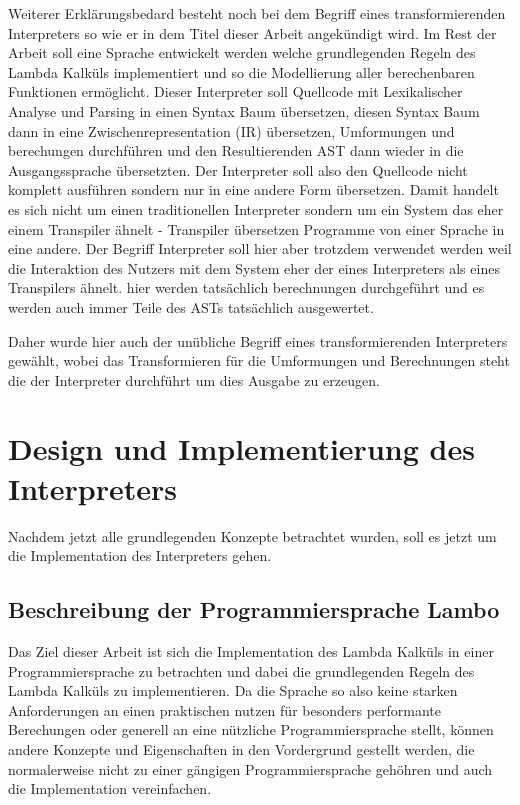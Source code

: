 \documentclass[ngerman]{article}
\begin{document}
Weiterer Erklärungsbedard besteht noch bei dem Begriff eines transformierenden Interpreters so wie er in dem Titel dieser Arbeit angekündigt wird. Im Rest der Arbeit soll eine Sprache entwickelt werden welche grundlegenden Regeln des Lambda Kalküls implementiert und so die Modellierung aller berechenbaren Funktionen ermöglicht. Dieser Interpreter soll Quellcode mit Lexikalischer Analyse und Parsing in einen Syntax Baum übersetzen, diesen Syntax Baum dann in eine Zwischenrepresentation (IR) übersetzen, Umformungen und berechungen durchführen und den Resultierenden AST dann wieder in die Ausgangssprache übersetzten. Der Interpreter soll also den Quellcode nicht komplett ausführen sondern nur in eine andere Form übersetzen. Damit handelt es sich nicht um einen traditionellen Interpreter sondern um ein System das eher einem Transpiler ähnelt - Transpiler übersetzen Programme von einer Sprache in eine andere. Der Begriff Interpreter soll hier aber trotzdem verwendet werden weil die Interaktion des Nutzers mit dem System eher der eines Interpreters als eines Transpilers ähnelt. hier werden tatsächlich berechnungen durchgeführt und es werden auch immer Teile des ASTs tatsächlich ausgewertet.

Daher wurde hier auch der unübliche Begriff eines transformierenden Interpreters gewählt, wobei das Transformieren für die Umformungen und Berechnungen steht die der Interpreter durchführt um dies Ausgabe zu erzeugen.

\section{Design und Implementierung des Interpreters}

Nachdem jetzt alle grundlegenden Konzepte betrachtet wurden, soll es jetzt um die Implementation des Interpreters gehen. 

\subsection{Beschreibung der Programmiersprache Lambo}

Das Ziel dieser Arbeit ist sich die Implementation des Lambda Kalküls in einer Programmiersprache zu betrachten und dabei die grundlegenden Regeln des Lambda Kalküls zu implementieren. Da die Sprache so also keine starken Anforderungen an einen praktischen nutzen für besonders performante Berechungen oder generell an eine nützliche Programmiersprache stellt, können andere Konzepte und Eigenschaften in den Vordergrund gestellt werden, die normalerweise nicht zu einer gängigen Programmiersprache gehöhren und auch die Implementation vereinfachen.
\end{document}
